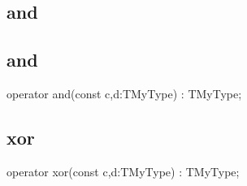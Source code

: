 \documentclass{report}
\newif\ifpdf
\begin{document}
\subsection*{\large{\textbf{and}}\normalsize\hspace{1ex}\hrulefill}
\else
\subsection*{and}
\fi
\label{ok_operator_test-and}
\begin{list}{}{
\setlength{\itemindent}{0cm}
\setlength{\listparindent}{0cm}
\setlength{\leftmargin}{\evensidemargin}
\addtolength{\leftmargin}{\tmplength}
\settowidth{\labelsep}{X}
\addtolength{\leftmargin}{\labelsep}
\setlength{\labelwidth}{\tmplength}
}
\item[\textbf{Declaration}\hfill]
\ifpdf
\begin{flushleft}
\fi
\begin{ttfamily}
operator and(const c,d:TMyType) : TMyType;\end{ttfamily}

\ifpdf
\end{flushleft}
\fi

\end{list}
\ifpdf
\subsection*{\large{\textbf{xor}}\normalsize\hspace{1ex}\hrulefill}
\else
\subsection*{xor}
\fi
\label{ok_operator_test-xor}
\begin{list}{}{
\setlength{\itemindent}{0cm}
\setlength{\listparindent}{0cm}
\setlength{\leftmargin}{\evensidemargin}
\addtolength{\leftmargin}{\tmplength}
\settowidth{\labelsep}{X}
\addtolength{\leftmargin}{\labelsep}
\setlength{\labelwidth}{\tmplength}
}
\item[\textbf{Declaration}\hfill]
\ifpdf
\begin{flushleft}
\fi
\begin{ttfamily}
operator xor(const c,d:TMyType) : TMyType;\end{ttfamily}

\ifpdf
\end{flushleft}
\fi

\end{list}
\end{document}
